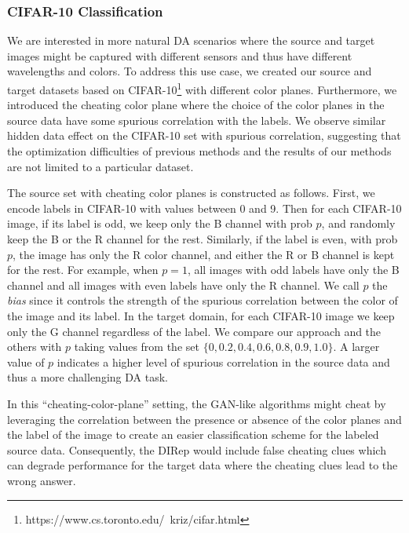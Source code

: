 \documentclass{article}
\begin{document}
\subsubsection{CIFAR-10 Classification}

We are interested in more natural DA scenarios where the source and target images might be captured with different sensors and thus have different wavelengths and colors. To address this use case, we created our source and target datasets based on CIFAR-10\footnote{https://www.cs.toronto.edu/~kriz/cifar.html} with different color planes. Furthermore,  we introduced the cheating color plane where the choice of the color planes in  the source data have some spurious correlation with the labels. We observe similar hidden data effect on the CIFAR-10 set with spurious correlation, suggesting that the optimization difficulties of previous methods and the results of our methods are not limited to a particular dataset. 

The source set with cheating color planes is constructed as follows. First, we encode labels in CIFAR-10 with values between 0 and 9. Then for each CIFAR-10 image, if its label is odd, we keep only the B channel with prob  $p$, and randomly keep the B or the R channel for the rest. Similarly, if the label is even, with prob $p$, the image has only the R color channel, and  either the R or B channel is kept for the rest. For example, when $p=1$, all images with odd labels have only the B channel and all images with even labels have only the R channel. We call $p$ the \textit{bias} since it controls the strength of the spurious correlation between the color of the image and its label. In the target domain, for each CIFAR-10 image we keep only the G channel regardless of the label. We compare our approach and the others with $p$ taking values from the set $\{0, 0.2, 0.4, 0.6, 0.8, 0.9, 1.0\}$. A larger value of $p$ indicates a higher level of spurious correlation in the source data and thus a more challenging DA task. 

 In this ``cheating-color-plane” setting, the GAN-like  algorithms might cheat by leveraging the correlation between the presence or absence of the color planes and the label of the image to create an easier classification scheme for the labeled source data. %
 Consequently, the DIRep would include false cheating clues which can degrade performance for the target data where the cheating clues lead to the wrong answer.
\end{document}
